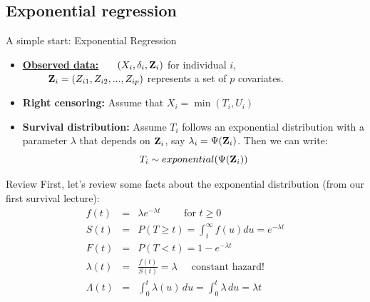 \documentclass[envcountsect, 10pt, portrait, palatino]{beamer}
\newcommand{\bfZ}{{\mbox{{\bf Z}}}}
\begin{document}
\subsection{Exponential regression}
\begin{frame}{A simple start:  Exponential Regression}

\begin{itemize}
\item \underline{\bf Observed data:} ~~~$(X_i, \delta_i, {\bf Z}_i)$
for individual $i$,\\
~~~~~$\bfZ_i= (Z_{i1}, Z_{i2},...,Z_{ip})$ represents a set of $p$
covariates.\\
\item {\bf Right censoring:}  Assume that  $X_i = \min(T_i,U_i)$\\
\item {\bf Survival distribution:} Assume $T_i$ follows an exponential
distribution with a parameter $\lambda$ that depends on $\bfZ_i$,
say $\lambda_i=\Psi(\bfZ_i)$.  Then we can write:
\[  T_i \sim exponential(\Psi(\bfZ_i)) \]
\end{itemize}

\end{frame} 
\begin{frame}{Review}
First, let's review some facts about the exponential distribution
(from our first survival lecture):
\begin{eqnarray*}
f(t) & = & \lambda e^{-\lambda t} ~~~~~~~~~\mbox{ for } t\ge 0 \\[2ex]
S(t) & = & P(T \geq t) = \int_t^\infty f(u) du = e^{-\lambda t} \\[2ex]
F(t) & = & P(T < t) = 1 - e^{-\lambda t} \\[2ex]
\lambda(t) & = & \frac{f(t)}{S(t)} =  \lambda
~~~~~\mbox{ constant hazard!} \\[2ex]
\Lambda(t) & = & \int_0^t \lambda(u) \, du  =  \int_0^t \lambda \, du
= \lambda t
\end{eqnarray*}
\end{frame} 
\end{document}
